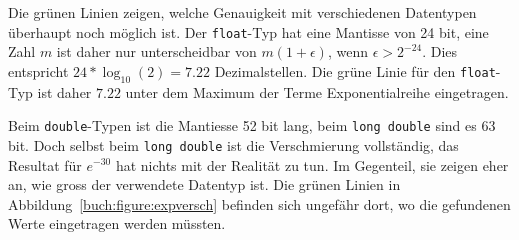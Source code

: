 \bgroup
{}
Die {\color{darkgreen}grünen} Linien zeigen, welche Genauigkeit mit verschiedenen Datentypen
überhaupt noch möglich ist.
Der \texttt{float}-Typ hat eine Mantisse von 24 bit, eine Zahl $m$ ist
daher nur unterscheidbar von $m(1+\epsilon)$, wenn $\epsilon > 2^{-24}$.
Dies entspricht $24*\log_10(2) = 7.22$ Dezimalstellen.
Die {\color{darkgreen}grüne} Linie für den \texttt{float}-Typ ist daher
$7.22$ unter dem Maximum der Terme Exponentialreihe eingetragen.

Beim \texttt{double}-Typen ist die Mantiesse 52 bit lang, beim
\texttt{long double} sind es 63 bit.
Doch selbst beim \texttt{long double} ist die Verschmierung vollständig,
das Resultat für $e^{-30}$ hat nichts mit der Realität zu tun.
Im Gegenteil, sie zeigen eher an, wie gross der verwendete Datentyp ist.
Die {\color{darkgreen}grünen} Linien in Abbildung~\ref{buch:figure:expversch}
befinden sich ungefähr dort, wo die gefundenen Werte
eingetragen werden müssten.
\egroup

